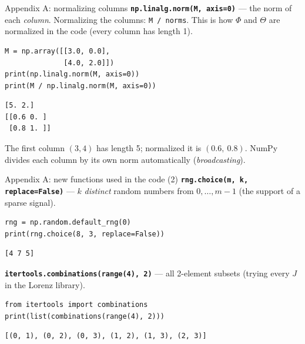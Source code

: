 \documentclass[aspectratio=169,11pt]{beamer}
\newcommand{\en}[1]{\textit{#1}}          %
\begin{document}
\begin{frame}[fragile]{Appendix A: normalizing columns}
  \textbf{\texttt{np.linalg.norm(M, axis=0)}} --- the norm of each \emph{column}. Normalizing the columns: \texttt{M / norms}.
  This is how $\Phi$ and $\Theta$ are normalized in the code (every column has length 1).
\begin{lstlisting}
M = np.array([[3.0, 0.0],
              [4.0, 2.0]])
print(np.linalg.norm(M, axis=0))
print(M / np.linalg.norm(M, axis=0))
\end{lstlisting}
\begin{lstlisting}
[5. 2.]
[[0.6 0. ]
 [0.8 1. ]]
\end{lstlisting}
  {\small The first column $(3,4)$ has length 5; normalized it is $(0.6,\ 0.8)$. NumPy divides each column by its own norm automatically (\en{broadcasting}).}
\end{frame}

\begin{frame}[fragile]{Appendix A: new functions used in the code (2)}
  \textbf{\texttt{rng.choice(m, k, replace=False)}} --- $k$ \emph{distinct} random numbers from $0,\dots,m-1$ (the support of a sparse signal).
\begin{lstlisting}
rng = np.random.default_rng(0)
print(rng.choice(8, 3, replace=False))
\end{lstlisting}
\begin{lstlisting}
[4 7 5]
\end{lstlisting}
  \textbf{\texttt{itertools.combinations(range(4), 2)}} --- all 2-element subsets (trying every $J$ in the Lorenz library).
\begin{lstlisting}
from itertools import combinations
print(list(combinations(range(4), 2)))
\end{lstlisting}
\begin{lstlisting}
[(0, 1), (0, 2), (0, 3), (1, 2), (1, 3), (2, 3)]
\end{lstlisting}
\end{frame}
\end{document}
